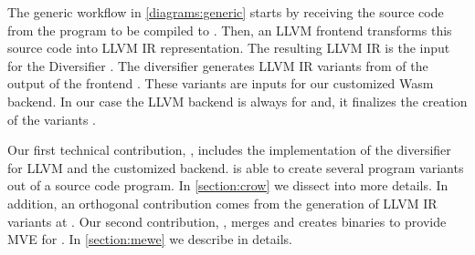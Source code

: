 The generic workflow in \autoref{diagrams:generic} starts by receiving the source code from the program to be compiled to \wasm. Then, an LLVM frontend transforms this source code into LLVM IR representation. The resulting LLVM IR is the input for the Diversifier .  
The diversifier generates LLVM IR variants from of the output of the frontend . These variants are inputs for our customized Wasm backend. In our case the LLVM backend is always for \wasm and, it finalizes the creation of the variants . 

Our first technical contribution,  \cite{CROW}, includes the implementation of the diversifier for LLVM and the customized \wasm backend. is able to create several \wasm program variants out of a source code program. In \autoref{section:crow} we dissect into more details.
In addition, an orthogonal contribution comes from the generation of LLVM IR variants at . Our second contribution,  \cite{MEWE}, merges and creates binaries to provide MVE for \wasm {}. In \autoref{section:mewe} we describe in details.

